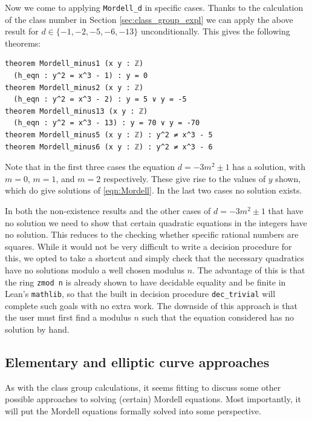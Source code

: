 \documentclass[sigplan,10pt,nonacm,
screen]{acmart} \settopmatter{printfolios=true,printccs=false,printacmref=false}
\newcommand{\mathlib}{\lstinline{mathlib}\xspace}
\begin{document}
Now we come to applying \lstinline{Mordell_d} in specific cases.
Thanks to the calculation of the class number in Section \ref{sec:class_group_expl} we can apply the above result for $d \in \{-1,-2,-5,-6,-13\}$ unconditionally.
This gives the following theorems:
\begin{lstlisting}
theorem Mordell_minus1 (x y : ℤ)
  (h_eqn : y^2 = x^3 - 1) : y = 0
theorem Mordell_minus2 (x y : ℤ)
  (h_eqn : y^2 = x^3 - 2) : y = 5 ∨ y = -5
theorem Mordell_minus13 (x y : ℤ)
  (h_eqn : y^2 = x^3 - 13) : y = 70 ∨ y = -70
theorem Mordell_minus5 (x y : ℤ) : y^2 ≠ x^3 - 5
theorem Mordell_minus6 (x y : ℤ) : y^2 ≠ x^3 - 6

\end{lstlisting}

Note that in the first three cases the equation $d = - 3m^2 \pm 1$ has a solution, with $m=0$, $m = 1$, and $m=2$ respectively.
These give rise to the values of $y$ shown, which do give solutions of \ref{eqn:Mordell}.
In the last two cases no solution exists.

In both the non-existence results and the other cases of $d = - 3m^2 \pm 1$ that have no solution we need to show that certain quadratic equations in the integers have no solution.
This reduces to the checking whether specific rational numbers are squares.
While it would not be very difficult to write a decision procedure for this,
we opted to take a shortcut and simply check that the necessary quadratics have no solutions modulo a well chosen modulus $n$.
The advantage of this is that the ring \lstinline{zmod n} is already shown to have decidable equality and be finite in Lean's \mathlib, so that the built in decision procedure \lstinline{dec_trivial} will complete such goals with no extra work.
The downside of this approach is that the user must first find a modulus $n$ such that the equation considered has no solution by hand.

\subsection{Elementary and elliptic curve approaches}

As with the class group calculations, it seems fitting to discuss some other possible approaches to solving (certain) Mordell equations.
Most importantly, it will put the Mordell equations formally solved into some perspective.
\end{document}
